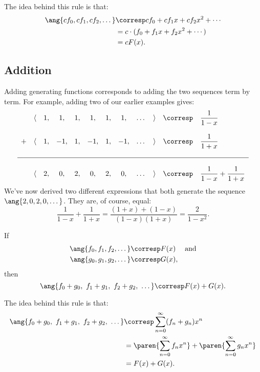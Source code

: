 The idea behind this rule is that:
\begin{align*}
\ang{c f_0, c f_1, c f_2, \dots}
    & \corresp c f_0 + c f_1 x + c f_2 x^2 + \cdots \\
    & = c \cdot (f_0 + f_1 x + f_2 x^2 + \cdots) \\
    & = c F(x).
\end{align*}

\subsection{Addition}

Adding generating functions corresponds to adding the two sequences
term by term.  For example, adding two of our earlier examples gives:
%
\[
\begin{array}{cccccccccccl}
  & \langle & 1, & 1, & 1, & 1, & 1, & 1, & \dots & \rangle &
    \corresp & \dfrac{1}{1-x} \\
\\
+ & \langle & 1, & -1, & 1, & -1, & 1, & -1, & \dots & \rangle &
    \corresp & \dfrac{1}{1+x} \\
\\
\hline
\\
& \langle & 2, & 0, & 2, & 0, & 2, & 0, & \dots & \rangle &
    \corresp & \dfrac{1}{1-x} + \dfrac{1}{1+x}
\end{array}
\]
%
We've now derived two different expressions that both generate the
sequence $\ang{2, 0, 2, 0, \dots}$.  They are, of course, equal:
%
\[
\frac{1}{1-x} + \frac{1}{1+x}
    = \frac{(1 + x) + (1 - x)}{(1-x)(1+x)} = \frac{2}{1-x^2}.
\]

\begin{rul}
\label{rule:addition}
If
%
\begin{align*}
\ang{f_0, f_1, f_2, \dots} & \corresp F(x) & \text{and} \\
\ang{g_0, g_1, g_2, \dots} & \corresp G(x),
\end{align*}
%
then
%
\[
\ang{f_0 + g_0,\ f_1 + g_1,\ f_2 + g_2,\ \dots}
    \corresp F(x) + G(x).
\]
\end{rul}

The idea behind this rule is that:
\begin{align*}
\ang{f_0 + g_0,\ f_1 + g_1,\ f_2 + g_2,\ \dots}
    & \corresp \sum_{n=0}^\infty (f_n + g_n) x^n \\
    & = \paren{\sum_{n=0}^\infty f_n x^n} +
        \paren{\sum_{n=0}^\infty g_n x^n} \\
    & = F(x) + G(x).
\end{align*}

